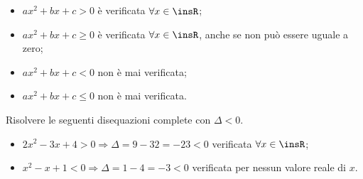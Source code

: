 \begin{itemize}
\item ${ax}^2+{bx}+c>0$ è verificata $\forall x\in \insR$;
\item ${ax}^2+{bx}+c\ge 0$ è verificata $\forall x\in \insR$, anche se non può essere uguale a zero;
\item ${ax}^2+{bx}+c<0$ non è mai verificata;
\item ${ax}^2+{bx}+c\le 0$ non è mai verificata.
\end{itemize}
\newpage
\begin{exrig}
\begin{esempio}
Risolvere le seguenti disequazioni complete con $\Delta<0$.
\begin{itemize}
\item $2x^2-3x+4>0 \Rightarrow \Delta =9-32=-23<0$ verificata $\forall x\in \insR$;
\item $x^2-x+1<0\Rightarrow \Delta =1-4=-3<0$ verificata per nessun valore reale di $x$.
\end{itemize}
\end{esempio}
\end{exrig}

